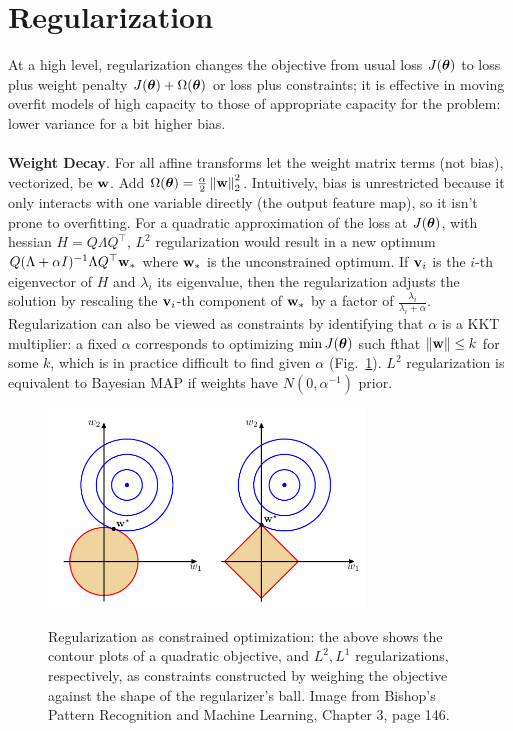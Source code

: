 \documentclass{article}
\begin{document}
\section{Regularization}

At a high level, regularization changes the objective from usual loss $J({\boldsymbol\theta})$ to loss plus weight penalty $J({\boldsymbol\theta})+\Omega({\boldsymbol\theta})$ or loss plus constraints; it is effective in moving overfit models of high capacity to those of appropriate capacity for the problem: lower variance for a bit higher bias.
\\\\
\noindent
\textbf{Weight Decay}. For all affine transforms let the weight matrix terms (not bias), vectorized, be $\textbf{w}$. Add $\Omega({\boldsymbol\theta})=\frac{\alpha}{2}\left\| \textbf{w} \right\|_2^2$. Intuitively, bias is unrestricted because it only interacts with one variable directly (the output feature map), so it isn't prone to overfitting. For a quadratic approximation of the loss at $J({\boldsymbol\theta})$, with hessian $H=Q\Lambda Q^\top$, $L^2$ regularization would result in a new optimum $Q(\Lambda+\alpha I)^{-1}\Lambda Q^\top \textbf{w}_*$ where $\textbf{w}_*$ is the unconstrained optimum. If $\textbf{v}_i$ is the $i$-th eigenvector of $H$ and $\lambda_i$ its eigenvalue, then the regularization adjusts the solution by rescaling the $\textbf{v}_i$-th component of $\textbf{w}_*$ by a factor of $\frac{\lambda_i}{\lambda_i+\alpha}$. Regularization can also be viewed as constraints by identifying that $\alpha$ is a KKT multiplier: a fixed $\alpha$ corresponds to optimizing $\min J({\boldsymbol\theta})$ such fthat $\left\| \textbf{w} \right\|\le k$ for some $k$, which is in practice difficult to find given $\alpha$ (Fig.~\ref{fig:reg}). $L^2$ regularization is equivalent to Bayesian MAP if weights have $N(0,\alpha^{-1})$ prior.
\begin{figure}[!h]
\centering
{\includegraphics[width=0.75\textwidth]{reg.pdf}}
  \caption{Regularization as constrained optimization: the above shows the contour plots of a quadratic objective, and $L^2,L^1$ regularizations, respectively, as constraints constructed by weighing the objective against the shape of the regularizer's ball. Image from Bishop's Pattern Recognition and Machine Learning, Chapter 3, page 146.}
\label{fig:reg}
\end{figure}
\end{document}
